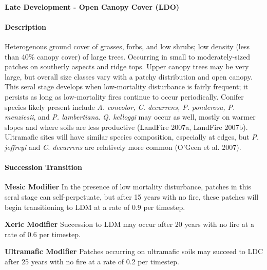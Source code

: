 \noindent\hrulefill


\paragraph{Late Development - Open Canopy Cover (LDO)}

\paragraph{Description} Heterogenous ground cover of grasses, forbs, and low shrubs; low density (less than 40\% canopy cover) of large trees. Occurring in small to moderately-sized patches on southerly aspects and ridge tops. Upper canopy trees may be very large, but overall size classes vary with a patchy distribution and open canopy. This seral stage develops when low-mortality disturbance is fairly frequent; it persists as long as low-mortality fires continue to occur periodically. Conifer species likely present include \emph{A. concolor, C. decurrens, P. ponderosa, P. menziesii}, and \emph{P. lambertiana}. \emph{Q. kelloggi} may occur as well, mostly on warmer slopes and where soils are less productive (LandFire 2007a, LandFire 2007b). Ultramafic sites will have similar species composition, especially at edges, but \emph{P. jeffreyi} and \emph{C. decurrens} are relatively more common (O'Geen et al. 2007).


\paragraph{Succession Transition}
\begin{adjustwidth}{2cm}{}
\textbf{Mesic Modifier } In the presence of low mortality disturbance, patches in this seral stage can self-perpetuate, but after 15 years with no fire, these patches will begin transitioning to LDM at a rate of 0.9 per timestep.

\medskip
\noindent \textbf{Xeric Modifier}  Succession to LDM may occur after 20 years with no fire at a rate of 0.6 per timestep. 

\medskip
\noindent \textbf{Ultramafic Modifier} Patches occurring on ultramafic soils may succeed to LDC after 25 years with no fire at a rate of 0.2 per timestep.

\end{adjustwidth}

